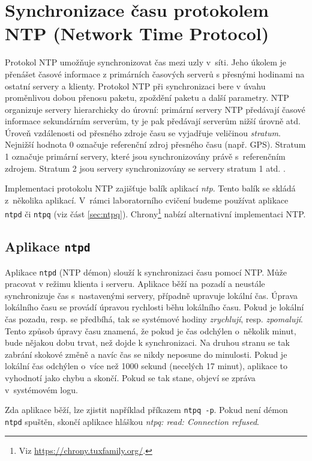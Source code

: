 \section{Synchronizace času protokolem NTP (Network Time Protocol)}\label{ntp}
Protokol NTP \cite{rfc1305} umožňuje synchronizovat čas mezi uzly v~síti. Jeho úkolem je přenášet časové informace z primárních časových serverů s přesnými hodinami na ostatní servery a klienty. Protokol NTP při synchronizaci bere v úvahu proměnlivou dobou přenosu paketu, zpoždění paketu a další parametry. NTP organizuje servery hierarchicky do úrovní: primární servery NTP předávají časové informace sekundárním serverům, ty je pak předávají serverům nižší úrovně atd. Úroveň vzdálenosti od přesného zdroje času se vyjadřuje veličinou {\em stratum}. Nejnižší hodnota 0 označuje referenční zdroj přesného času (např. GPS). Stratum 1 označuje primární servery, které jsou synchronizovány právě s~referenčním zdrojem. Stratum 2 jsou servery synchronizovány se servery stratum 1 atd. \cite{rfc5905}.

Implementaci protokolu NTP zajišťuje balík aplikací {\em ntp}. Tento balík se skládá z~několika
aplikací. V~rámci laboratorního cvičení budeme používat aplikace {\tt ntpd} či {\tt ntpq} (viz část \ref{sec:ntpq}). Chrony\footnote{Viz \url{https://chrony.tuxfamily.org/}.} nabízí alternativní
implementaci NTP.

\subsection{Aplikace {\tt ntpd}}
Aplikace {\tt ntpd} (NTP démon) slouží k synchronizaci času pomocí NTP. Může pracovat v režimu klienta i serveru. Aplikace běží na pozadí a neustále synchronizuje čas s~nastavenými servery, případně upravuje lokální čas. Úprava lokálního času se provádí úpravou rychlosti běhu lokálního času. Pokud je lokální čas pozadu, resp. se předbíhá, tak se systémové hodiny {\em zrychlují}, resp. {\em zpomalují}. Tento způsob úpravy času znamená, že pokud je čas odchýlen o~několik minut, bude nějakou dobu trvat, než dojde k synchronizaci. Na druhou stranu se tak zabrání skokové změně a navíc čas se nikdy neposune do minulosti. Pokud je lokální čas odchýlen o~více než 1000 sekund (necelých 17 minut), aplikace to vyhodnotí jako chybu a skončí. Pokud se tak stane, objeví se zpráva v~systémovém logu.

Zda aplikace běží, lze zjistit například příkazem {\tt ntpq -p}. Pokud není démon {\tt ntpd} spuštěn, skončí aplikace hláškou {\em ntpq: read: Connection refused}. 

